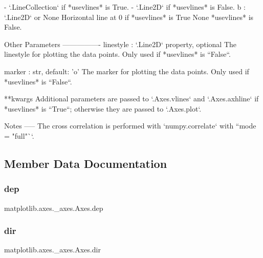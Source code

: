 \begin{DoxyVerb}
\begin{DoxyVerb}
    - `.LineCollection` if *usevlines* is True.
    - `.Line2D` if *usevlines* is False.
b : `.Line2D` or None
    Horizontal line at 0 if *usevlines* is True
    None *usevlines* is False.

Other Parameters
----------------
linestyle : `.Line2D` property, optional
    The linestyle for plotting the data points.
    Only used if *usevlines* is ``False``.

marker : str, default: 'o'
    The marker for plotting the data points.
    Only used if *usevlines* is ``False``.

**kwargs
    Additional parameters are passed to `.Axes.vlines` and
    `.Axes.axhline` if *usevlines* is ``True``; otherwise they are
    passed to `.Axes.plot`.

Notes
-----
The cross correlation is performed with `numpy.correlate` with
``mode = "full"``.
\end{DoxyVerb}
 

\subsection{Member Data Documentation}
\mbox{\label{classmatplotlib_1_1axes_1_1__axes_1_1Axes_ac1a8a79147213ff0727f37caa19c32a8}} 
\subsubsection{\texorpdfstring{dep}{dep}}
{\footnotesize\ttfamily matplotlib.\+axes.\+\_\+axes.\+Axes.\+dep\hspace{0.3cm}{\ttfamily [static]}}

\mbox{\label{classmatplotlib_1_1axes_1_1__axes_1_1Axes_a10c7f458f94569ad7ba7dc36b49d2b89}} 
\subsubsection{\texorpdfstring{dir}{dir}}
{\footnotesize\ttfamily matplotlib.\+axes.\+\_\+axes.\+Axes.\+dir\hspace{0.3cm}{\ttfamily [static]}}


\end{DoxyVerb}

